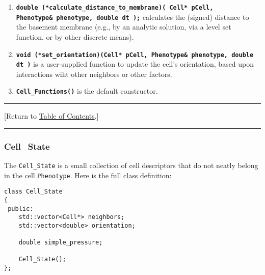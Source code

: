 \documentclass[12pt]{article}
\renewcommand{\v}{\verb}
\newcommand{\smallcode}[1]{\textbf{\texttt{#1}}}
\newcommand{\TOClink}{\begin{center}\hrule\vskip-5pt\phantom{.}\hfill[Return to \hyperlink{TOC}{Table of Contents}.]\hfill\phantom{.}\vskip3pt\hrule\end{center}}
\begin{document}
\begin{enumerate}
\item
\smallcode{double (*calculate\_distance\_to\_membrane)( Cell* pCell, \\
\phantom{double }Phenotype\& phenotype, double dt );} calculates the 
(signed) distance to the basement membrane (e.g., by an analytic solution, 
via a level set function, or by other discrete means). 

\item
\smallcode{void (*set\_orientation)(Cell* pCell, Phenotype\& phenotype, double dt )} 
is a user-supplied function to update the cell's orientation, based upon interactions 
wiht other neighbors or other factors. 

\item 
\smallcode{Cell\_Functions()} is the default constructor. 

\end{enumerate}

\TOClink 

\subsubsection{Cell\_State}
\label{sec:Cell_State}
The \v|Cell_State| is a small collection of cell 
descriptors that do not neatly belong in the cell \v|Phenotype|. 
Here is the full class definition: 
\begin{verbatim}
class Cell_State
{
 public:
    std::vector<Cell*> neighbors;   
    std::vector<double> orientation;
    
    double simple_pressure; 
    
    Cell_State(); 
};
\end{verbatim}
\end{document}
